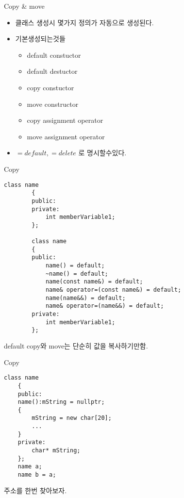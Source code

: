 \documentclass[10pt]{beamer}
\begin{document}
\begin{frame}{Copy \& move}
    \begin{itemize}
        \item 클래스 생성시 몇가지 정의가 자동으로 생성된다.
        \item 기본생성되는것들
        \begin{itemize}
            \item default constuctor
            \item default destuctor
            \item copy constuctor 
            \item move constructor
            \item copy assignment operator
            \item move assignment operator
        \end{itemize}
        \item $=default, =delete$ 로 명시할수있다.
    \end{itemize}
\end{frame}    


\begin{frame}[fragile]{Copy}
    \begin{lstlisting}[style = CppStyle]
        class name
        {
        public:
        private:
            int memberVariable1;
        };

        class name
        {
        public:
            name() = default;
            ~name() = default;
            name(const name&) = default;
            name& operator=(const name&) = default;
            name(name&&) = default;
            name& operator=(name&&) = default;
        private:
            int memberVariable1;
        };
        \end{lstlisting}
        default copy와 move는 단순히 값을 복사하기만함.
\end{frame}



\begin{frame}[fragile]{Copy}
    \begin{lstlisting}[style = CppStyle]
    class name
    {
    public:
    name():mString = nullptr;
    {
        mString = new char[20];
        ...
    }
    private:
        char* mString;
    };
    name a;
    name b = a;
    \end{lstlisting}
    주소를 한번 찾아보자.
\end{frame}
\end{document}
